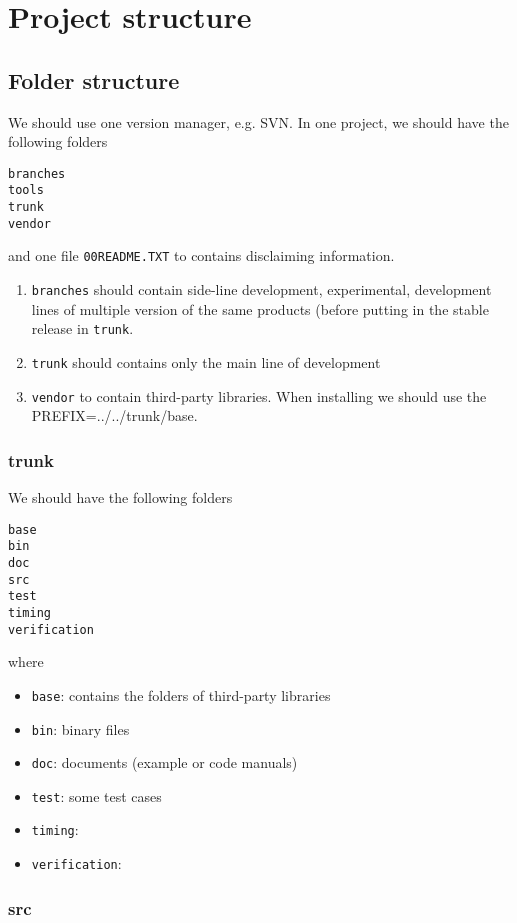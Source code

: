 \chapter{Project structure}

\section{Folder structure}

We should use one version manager, e.g. SVN. In one project, we should have the
following folders
\begin{verbatim}
branches
tools
trunk
vendor 
\end{verbatim}
and one file \verb!00README.TXT! to contains disclaiming information.
\begin{enumerate} 
  \item \verb!branches! should contain side-line development, experimental,
  development lines of multiple version of the same products (before putting in
  the stable release in \verb!trunk!.
  \item \verb!trunk! should contains only the main line of development
  \item \verb!vendor! to contain third-party libraries. When installing we
  should use the PREFIX=../../trunk/base.
\end{enumerate}


\subsection{trunk}

We should have the following folders
\begin{verbatim}
base
bin
doc
src
test
timing
verification
\end{verbatim}
where
\begin{itemize}
  \item \verb!base!: contains the folders of third-party libraries
  \item \verb!bin!: binary files
  \item \verb!doc!: documents (example or code manuals)
  \item \verb!test!: some test cases
  \item \verb!timing!:
  \item \verb!verification!: 
\end{itemize}

\subsection{src}

